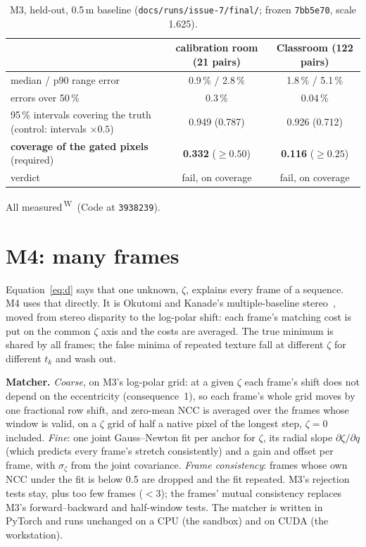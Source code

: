 \documentclass[11pt,a4paper]{article}
\newcommand{\code}[1]{\texttt{\small #1}}
\newcommand{\src}[1]{\textsuperscript{\,#1}}
\newcommand{\WS}{\src{W}}   %
\begin{document}
\begin{table}[h]
\centering\small
\caption{M3, held-out, 0.5\,m baseline (\code{docs/runs/issue-7/final/}; frozen \code{7bb5e70}, scale 1.625).}\label{tab:m3}
\begin{tabularx}{\linewidth}{@{}Lcc@{}}
\toprule
& calibration room (21 pairs) & Classroom (122 pairs) \\
\midrule
median / p90 range error & 0.9\,\% / 2.8\,\% & 1.8\,\% / 5.1\,\% \\
errors over 50\,\% & 0.3\,\% & 0.04\,\% \\
95\,\% intervals covering the truth (control: intervals $\times0.5$) & 0.949 (0.787) & 0.926 (0.712) \\
\textbf{coverage of the gated pixels} (required) & \textbf{0.332} ($\ge0.50$) & \textbf{0.116} ($\ge0.25$) \\
verdict & fail, on coverage & fail, on coverage \\
\bottomrule
\end{tabularx}
\par\smallskip\raggedright\footnotesize All measured\WS\ (Code at \code{3938239}).
\end{table}

\section{M4: many frames}\label{sec:m4}

Equation~\eqref{eq:d} says that one unknown, $\zeta$, explains every frame of a sequence. M4 uses that directly. It is
Okutomi and Kanade's multiple-baseline stereo~\cite{okutomi}, moved from stereo disparity to the log-polar shift: each
frame's matching cost is put on the common $\zeta$ axis and the costs are averaged. The true minimum is shared by all
frames; the false minima of repeated texture fall at different $\zeta$ for different $t_k$ and wash out.

\textbf{Matcher.} \emph{Coarse}, on M3's log-polar grid: at a given $\zeta$ each frame's shift does not depend on the
eccentricity (consequence~1), so each frame's whole grid moves by one fractional row shift, and zero-mean NCC is averaged
over the frames whose window is valid, on a $\zeta$ grid of half a native pixel of the longest step, $\zeta=0$ included.
\emph{Fine}: one joint Gauss--Newton fit per anchor for $\zeta$, its radial slope $\partial\zeta/\partial q$ (which predicts
every frame's stretch consistently) and a gain and offset per frame, with $\sigma_\zeta$ from the joint covariance.
\emph{Frame consistency}: frames whose own NCC under the fit is below 0.5 are dropped and the fit repeated. M3's rejection
tests stay, plus too few frames ($<3$); the frames' mutual consistency replaces M3's forward--backward and half-window
tests. The matcher is written in PyTorch and runs unchanged on a CPU (the sandbox) and on CUDA (the workstation).
\end{document}
